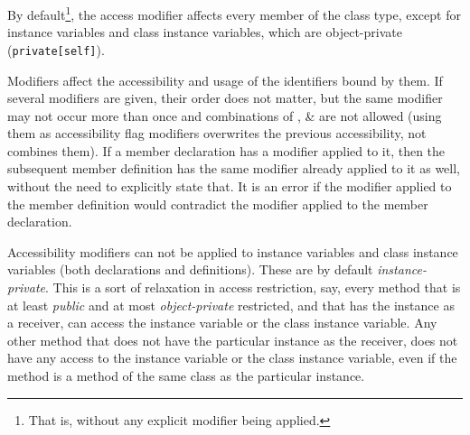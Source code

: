 By default\footnote{That is, without any explicit modifier being applied.}, the  access modifier affects every member of the class type, except for instance variables and class instance variables, which are object-private (\lstinline!private[self]!). 

Modifiers affect the accessibility and usage of the identifiers bound by them. If several modifiers are given, their order does not matter, but the same modifier may not occur more than once and combinations of ,  \&  are not allowed (using them as accessibility flag modifiers overwrites the previous accessibility, not combines them). If a member declaration has a modifier applied to it, then the subsequent member definition has the same modifier already applied to it as well, without the need to explicitly state that. It is an error if the modifier applied to the member definition would contradict the modifier applied to the member declaration. 

Accessibility modifiers can not be applied to instance variables and class instance variables (both declarations and definitions). These are by default {\em instance-private}. This is a sort of relaxation in access restriction, say, every method that is at least {\em public} and at most {\em object-private} restricted, and that has the instance as a receiver, can access the instance variable or the class instance variable. Any other method that does not have the particular instance as the receiver, does not have any access to the instance variable or the class instance variable, even if the method is a method of the same class as the particular instance. 

